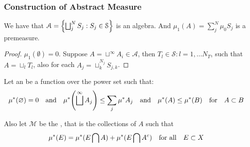 \subsubsection{Construction of Abstract Measure}

\begin{thm}
    We have that \(\mathcal{A} = \Bqty{\bigsqcup^{N}_{j} S_{j} : S_{j} \in \mathcal{S}}\) is an algebra. And \(\mu_{1}(A) = \sum^{N}_{j} \mu_{0} S_{j}\) is a premeasure. 
\end{thm}

\begin{proof}
    \(\mu_{1}(\emptyset) = 0\). Suppose \(A = \sqcup^{\infty} A_{i} \in \mathcal{A}\), then  \(T_{l}\in \mathcal{S}: l = 1,\dots N_T\), such that \(A = \sqcup_{l} T_{l}\), also for each \(A_{j} = \sqcup^{N_{j}}_{k} S_{j,k}\). 
\end{proof}

Let an  be a function over the power set such that:
\begin{equation*}
    \mu^{*}(\emptyset)= 0 \qq{and} \mu^{*}\pqty{\sqcup^{\infty} A_{j}}\leq \sum_{j} \mu^{*} A_{j} \qq{and} \mu^{*}(A) \leq \mu^{*}(B)  \qq{for} A \subset B
\end{equation*}

Also let \(\mathcal{M}\) be the , that is the collections of \(A\) such that 
\begin{equation*}
    \mu^{*} (E) = \mu^{*}(E\cap A) + \mu^{*} (E\cap A^{c}) \qq{for all} E \subset X
\end{equation*}

